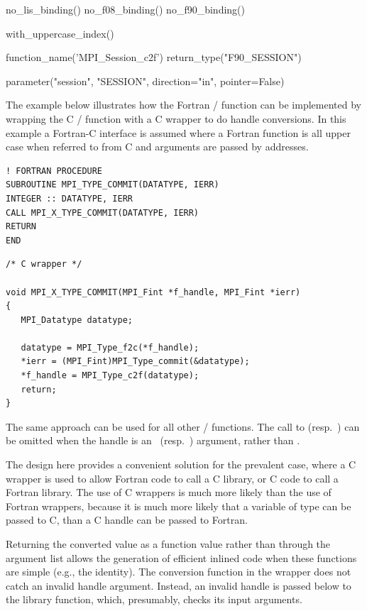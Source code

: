 \bindingislistfalse
{}%
\begin{mpi-binding}
    no_lis_binding()
    no_f08_binding()
    no_f90_binding()

    with_uppercase_index()

    function_name('MPI_Session_c2f')
    return_type("F90_SESSION")

    parameter("session", "SESSION", direction="in", pointer=False)
\end{mpi-binding}

\begin{example}
The example below illustrates how the Fortran \MPI/ function
 can be implemented by wrapping the C \MPI/
function  with a C wrapper to do handle
conversions.
In this example a Fortran-C interface is assumed where a Fortran function is
all upper case when referred to from C and arguments are passed by addresses.

%
%
\begin{lstlisting}[language={[MPI]Fortran}]
! FORTRAN PROCEDURE
SUBROUTINE MPI_TYPE_COMMIT(DATATYPE, IERR)
INTEGER :: DATATYPE, IERR
CALL MPI_X_TYPE_COMMIT(DATATYPE, IERR)
RETURN
END
\end{lstlisting}

\begin{lstlisting}[language={[MPI]C}]
/* C wrapper */

void MPI_X_TYPE_COMMIT(MPI_Fint *f_handle, MPI_Fint *ierr)
{
   MPI_Datatype datatype;

   datatype = MPI_Type_f2c(*f_handle);
   *ierr = (MPI_Fint)MPI_Type_commit(&datatype);
   *f_handle = MPI_Type_c2f(datatype);
   return;
}
\end{lstlisting}

The same approach can be used for all other \MPI/ functions.
The call to  (resp.\ )
can be
omitted when the handle is an \OUT\ (resp.\ \IN) argument, rather than
\INOUT.
\end{example}


\begin{rationale}
The design here provides a convenient solution for the prevalent case,
where a C wrapper is used to allow Fortran code to call a C
library, or C code to call a Fortran library.
The use of C wrappers is much more likely than the use of Fortran
wrappers, because it is much more likely that a variable of type
 can be passed to C,  than a C handle
can be passed to Fortran.

Returning the converted value as a function value rather than
through the argument list allows the generation of efficient
inlined code when these functions are simple (e.g., the identity).
The conversion function in the wrapper
does not catch an invalid handle argument.  Instead, an invalid handle
is passed below to the library function, which, presumably, checks its
input arguments.
\end{rationale}

